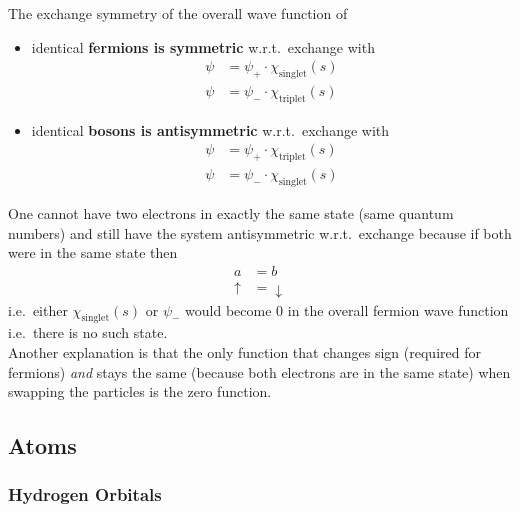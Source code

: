 The exchange symmetry of the overall wave function of
\begin{itemize}
    \item identical \textbf{fermions is symmetric} w.r.t.\ exchange with
          \begin{align*}
              \psi & = \psi_{+}\cdot \chi_{\mathrm{singlet}}(s) \\
              \psi & = \psi_{-}\cdot \chi_{\mathrm{triplet}}(s)
          \end{align*}
    \item identical \textbf{bosons is antisymmetric} w.r.t.\ exchange with
          \begin{align*}
              \psi & = \psi_{+}\cdot \chi_{\mathrm{triplet}}(s) \\
              \psi & = \psi_{-}\cdot \chi_{\mathrm{singlet}}(s)
          \end{align*}
\end{itemize}

\newpar{}

One cannot have two electrons in exactly the same state (same quantum numbers) and still have the system antisymmetric w.r.t.\ exchange because if both were in the same state then
\begin{align*}
    a        & =b           \\
    \uparrow & = \downarrow %
\end{align*}
i.e.\ either $\chi_{\mathrm{singlet}}(s)$ or $\psi_{-}$ would become $0$ in the overall fermion wave function i.e.\ there is no such state.\\
Another explanation is that the only function that changes sign (required for fermions) \textit{and} stays the same (because both electrons are in the same state) when swapping the particles is the zero function.

\subsection{Atoms}
\subsubsection{Hydrogen Orbitals}
